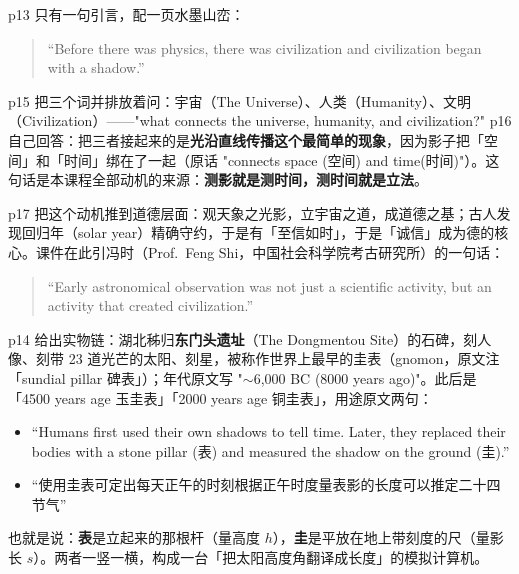 \documentclass[11pt]{ctexart}
\newcommand{\cpage}[1]{\textsf{p#1}}
\begin{document}

\cpage{13} 只有一句引言，配一页水墨山峦：

\begin{quote}
``Before there was physics, there was civilization and civilization began with a shadow.''
\end{quote}

\cpage{15} 把三个词并排放着问：宇宙（The Universe）、人类（Humanity）、文明（Civilization）——"what connects the universe, humanity, and civilization?" \cpage{16} 自己回答：把三者接起来的是\textbf{光沿直线传播这个最简单的现象}，因为影子把「空间」和「时间」绑在了一起（原话 "connects space (空间) and time(时间)"）。这句话是本课程全部动机的来源：\textbf{测影就是测时间，测时间就是立法}。

\cpage{17} 把这个动机推到道德层面：观天象之光影，立宇宙之道，成道德之基；古人发现回归年（solar year）精确守约，于是有「至信如时」，于是「诚信」成为德的核心。课件在此引冯时（Prof.~Feng Shi，中国社会科学院考古研究所）的一句话：

\begin{quote}
``Early astronomical observation was not just a scientific activity, but an activity that created civilization.''
\end{quote}


\cpage{14} 给出实物链：湖北秭归\textbf{东门头遗址}（The Dongmentou Site）的石碑，刻人像、刻带 23 道光芒的太阳、刻星，被称作世界上最早的圭表（gnomon，原文注「sundial pillar 碑表」）；年代原文写 "$\sim$6,000 BC (8000 years ago)"。此后是「4500 years age 玉圭表」「2000 years age 铜圭表」，用途原文两句：

\begin{itemize}
\item ``Humans first used their own shadows to tell time. Later, they replaced their bodies with a stone pillar (表) and measured the shadow on the ground (圭).''
\item ``使用圭表可定出每天正午的时刻根据正午时度量表影的长度可以推定二十四节气''
\end{itemize}

也就是说：\textbf{表}是立起来的那根杆（量高度 $h$），\textbf{圭}是平放在地上带刻度的尺（量影长 $s$）。两者一竖一横，构成一台「把太阳高度角翻译成长度」的模拟计算机。
\end{document}
